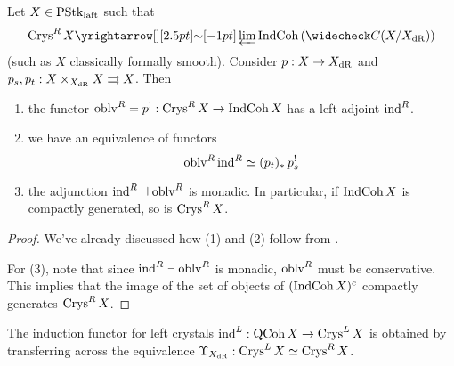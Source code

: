 \documentclass[./main.tex]{subfiles}
\begin{document}
\begin{prop}
  
  Let $X \in \mathrm{PStk}_{\mathrm{laft}}$ such that
  \[
    \CRYS^R\,X \map{\sim}{} \LIM \INDCOH\brkt{\check{C}(X / X_\DR)}
  \]
  (such as $X$ classically formally smooth).
  Consider $p : X \to X_{\mathrm{dR}}$ and 
  $p_s, p_t : X \times_{X_{\mathrm{dR}}} X \rightrightarrows X$.
  Then \begin{enumerate}
    \item the functor $\mathrm{oblv}^R = p^! : \mathrm{Crys}^R\,X \to \mathrm{IndCoh}\,X$
    has a left adjoint $\mathrm{ind}^R$.
    \item we have an equivalence of functors \[
      \mathrm{oblv}^R\,\mathrm{ind}^R \simeq (p_t)_*\,p_s^!
    \]
    \item the adjunction $\mathrm{ind}^R \dashv \mathrm{oblv}^R$ is monadic.
    In particular, if $\mathrm{IndCoh}\,X$ is compactly generated,
    so is $\mathrm{Crys}^R\,X$.\cite[Cor 3.3.3]{Crys}
  \end{enumerate}
  \cite[Prop 3.3.2]{Crys}
\end{prop}
\begin{proof}
  We've already discussed how (1) and (2) follow from
  .

  For (3), note that since $\mathrm{ind}^R \dashv \mathrm{oblv}^R$ is monadic,
  $\mathrm{oblv}^R$ must be conservative.
  This implies that the image of the set of objects of $(\mathrm{IndCoh}\,X)^c$
  compactly generates $\mathrm{Crys}^R\,X$.
\end{proof}

The induction functor for left crystals 
$\mathrm{ind}^L : \mathrm{QCoh}\,X \to \mathrm{Crys}^L\,X$ is obtained by 
transferring across the equivalence 
$\Upsilon_{X_{\mathrm{dR}}} : \mathrm{Crys}^L\,X \simeq \mathrm{Crys}^R\,X$.
\end{document}
